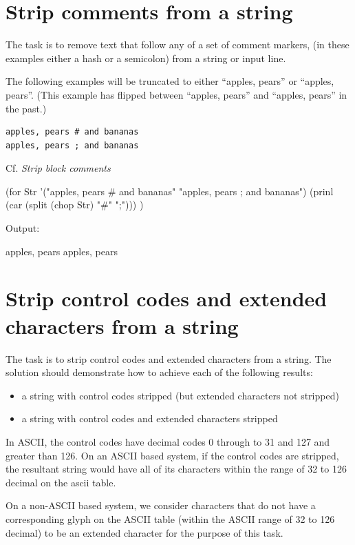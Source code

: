 \begin{itemize}
\section*{Strip comments from a string}

The task is to remove text that follow any of a set of comment markers,
(in these examples either a hash or a semicolon) from a string or input
line.

The following examples will be truncated to either ``apples, pears'' or
``apples, pears''. (This example has flipped between ``apples, pears''
and ``apples, pears'' in the past.)

\begin{verbatim}
apples, pears # and bananas
apples, pears ; and bananas
\end{verbatim}

Cf. \emph{Strip block comments}


\begin{wideverbatim}

(for Str '("apples, pears # and bananas" "apples, pears ; and bananas")
   (prinl (car (split (chop Str) "#" ";"))) )

Output:

apples, pears
apples, pears

\end{wideverbatim}

\pagebreak{}
\section*{Strip control codes and extended characters from a string}

The task is to strip control codes and extended characters from a
string. The solution should demonstrate how to achieve each of the
following results:

\begin{itemize}
\item
  a string with control codes stripped (but extended characters not
  stripped)
\item
  a string with control codes and extended characters stripped
\end{itemize}

In ASCII, the control codes have decimal codes 0 through to 31 and 127
and greater than 126. On an ASCII based system, if the control codes are
stripped, the resultant string would have all of its characters within
the range of 32 to 126 decimal on the ascii table.

On a non-ASCII based system, we consider characters that do not have a
corresponding glyph on the ASCII table (within the ASCII range of 32 to
126 decimal) to be an extended character for the purpose of this task.



\end{itemize}
